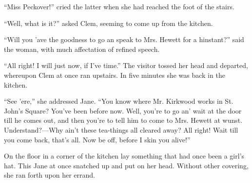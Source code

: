 ``Miss Peckover!'' cried the latter when she had reached the foot of the
stairs.

``Well, what is it?'' asked Clem, seeming to come up from the kitchen.

``Will you 'ave the goodness to go an speak to Mrs. Hewett for a
hinstant?'' said the woman, with much affectation of refined speech.

``All right! I will just now, if I've time.'' The visitor tossed her
head and departed, whereupon Clem at once ran upstairs. In five minutes
she was back in the kitchen.

{\protect\hypertarget{22}{}{}}``See 'ere,'' she addressed Jane. ``You
know where Mr. Kirkwood works in St. John's Square? You've been before
now. Well, you're to go an' wait at the door till he comes out, and then
you're to tell him to come to Mrs. Hewett at wunst. Understand?---Why
ain't these tea-things all cleared away? All right! Wait till you come
back, that's all. Now be off, before I skin you alive!''

On the floor in a corner of the kitchen lay something that had once been
a girl's hat. This Jane at once snatched up and put on her head. Without
other covering, she ran forth upon her errand.
